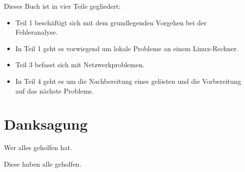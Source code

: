 \begin{normaltext}
  Dieses Buch ist in vier Teile gegliedert:
  \begin{itemize}
  \item Teil 1 beschäftigt sich mit dem grundlegenden Vorgehen bei der
    Fehleranalyse.
  \item In Teil 1 geht es vorwiegend um lokale Probleme an einem
    Linux-Rechner.
  \item Teil 3 befasst sich mit Netzwerkproblemen.
  \item In Teil 4 geht es um die Nachbereitung eines gelösten und die
    Vorbereitung auf das nächste Problems.
  \end{itemize}
\end{normaltext}

\section*{Danksagung}
\label{sec:problemstellung}

\begin{abstractsec}
  Wer alles geholfen hat.
\end{abstractsec}
\begin{normaltext}
  Diese haben alle geholfen.
\end{normaltext}

